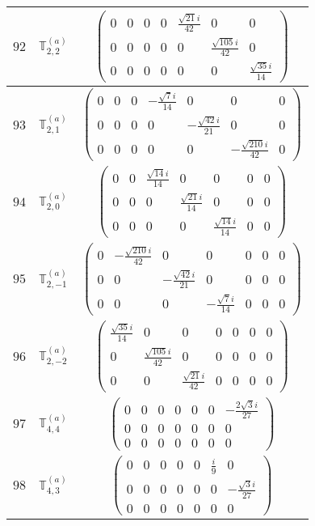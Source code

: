 \documentclass[fleqn,8pt,landscape]{jsarticle}
\begin{document}
\begin{center}
\begin{longtable}{ccc}
$ 92 $ & $ \mathbb{T}_{2,2}^{(a)} $ & $ \begin{pmatrix} 0 & 0 & 0 & 0 & \frac{\sqrt{21} i}{42} & 0 & 0 \\ 0 & 0 & 0 & 0 & 0 & \frac{\sqrt{105} i}{42} & 0 \\ 0 & 0 & 0 & 0 & 0 & 0 & \frac{\sqrt{35} i}{14} \end{pmatrix} $ \\ \hline
$ 93 $ & $ \mathbb{T}_{2,1}^{(a)} $ & $ \begin{pmatrix} 0 & 0 & 0 & - \frac{\sqrt{7} i}{14} & 0 & 0 & 0 \\ 0 & 0 & 0 & 0 & - \frac{\sqrt{42} i}{21} & 0 & 0 \\ 0 & 0 & 0 & 0 & 0 & - \frac{\sqrt{210} i}{42} & 0 \end{pmatrix} $ \\ \hline
$ 94 $ & $ \mathbb{T}_{2,0}^{(a)} $ & $ \begin{pmatrix} 0 & 0 & \frac{\sqrt{14} i}{14} & 0 & 0 & 0 & 0 \\ 0 & 0 & 0 & \frac{\sqrt{21} i}{14} & 0 & 0 & 0 \\ 0 & 0 & 0 & 0 & \frac{\sqrt{14} i}{14} & 0 & 0 \end{pmatrix} $ \\ \hline
$ 95 $ & $ \mathbb{T}_{2,-1}^{(a)} $ & $ \begin{pmatrix} 0 & - \frac{\sqrt{210} i}{42} & 0 & 0 & 0 & 0 & 0 \\ 0 & 0 & - \frac{\sqrt{42} i}{21} & 0 & 0 & 0 & 0 \\ 0 & 0 & 0 & - \frac{\sqrt{7} i}{14} & 0 & 0 & 0 \end{pmatrix} $ \\ \hline
$ 96 $ & $ \mathbb{T}_{2,-2}^{(a)} $ & $ \begin{pmatrix} \frac{\sqrt{35} i}{14} & 0 & 0 & 0 & 0 & 0 & 0 \\ 0 & \frac{\sqrt{105} i}{42} & 0 & 0 & 0 & 0 & 0 \\ 0 & 0 & \frac{\sqrt{21} i}{42} & 0 & 0 & 0 & 0 \end{pmatrix} $ \\ \hline
$ 97 $ & $ \mathbb{T}_{4,4}^{(a)} $ & $ \begin{pmatrix} 0 & 0 & 0 & 0 & 0 & 0 & - \frac{2 \sqrt{3} i}{27} \\ 0 & 0 & 0 & 0 & 0 & 0 & 0 \\ 0 & 0 & 0 & 0 & 0 & 0 & 0 \end{pmatrix} $ \\ \hline
$ 98 $ & $ \mathbb{T}_{4,3}^{(a)} $ & $ \begin{pmatrix} 0 & 0 & 0 & 0 & 0 & \frac{i}{9} & 0 \\ 0 & 0 & 0 & 0 & 0 & 0 & - \frac{\sqrt{3} i}{27} \\ 0 & 0 & 0 & 0 & 0 & 0 & 0 \end{pmatrix} $ \\ \hline

\end{longtable}
\end{center}
\end{document}
